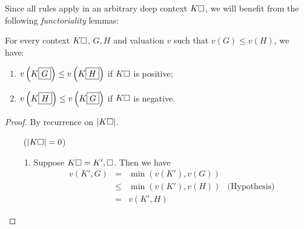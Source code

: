 \begin{scope}
Since all rules apply in an arbitrary deep context $K\square$, we will benefit
from the following \emph{functoriality} lemmas:


\begin{lemma}[Variance]
  
  For every context $K\square$,  $G, H$ and valuation $v$ such that $v(G)
  \leq v(H)$, we have:
  \begin{enumerate}
    \item $v\left(K\fbox{$G$}\right) \leq v\left(K\fbox{$H$}\right)$ if $K\square$
    is positive;
    \item $v\left(K\fbox{$H$}\right) \leq v\left(K\fbox{$G$}\right)$ if $K\square$
    is negative.
  \end{enumerate}
\end{lemma}
\begin{proof}
  By recurrence on $\left|K\square\right|$.

  \def\arraystretch{1.5}
  \begin{itemize}
    \item[\bcase~($\left|K\square\right| = 0$)]\sbr
      \begin{enumerate}
        \item Suppose $K\square = K', \square$. Then we have
        $$
        \begin{array}{rcll}
          v(K', G)
          &=& \min(v(K'), v(G)) & \\
          &\leq& \min(v(K'), v(H)) &\text{(Hypothesis)} \\
          &=& v(K', H) &
        \end{array}
        $$


\end{enumerate}
\end{itemize}
\end{proof}
\end{scope}
